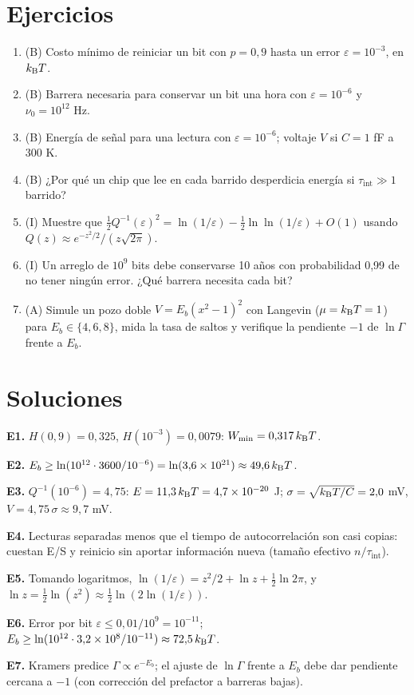 \documentclass[11pt,a4paper]{article}
\begin{document}
\section{Ejercicios}
\begin{enumerate}[label=\textbf{E\arabic*.}]
\item (B) Costo mínimo de reiniciar un bit con $p=0{,}9$ hasta un error $\varepsilon=10^{-3}$, en $k_{\mathrm B} T$.
\item (B) Barrera necesaria para conservar un bit una hora con $\varepsilon=10^{-6}$ y $\nu_0=10^{12}$ Hz.
\item (B) Energía de señal para una lectura con $\varepsilon=10^{-6}$; voltaje $V$ si $C=1$ fF a 300 K.
\item (B) ¿Por qué un chip que lee en cada barrido desperdicia energía si $\tau_{\text{int}}\gg1$ barrido?
\item (I) Muestre que $\tfrac12Q^{-1}(\varepsilon)^2=\ln(1/\varepsilon)-\tfrac12\ln\ln(1/\varepsilon)+O(1)$ usando $Q(z)\approx e^{-z^2/2}/(z\sqrt{2\pi})$.
\item (I) Un arreglo de $10^9$ bits debe conservarse 10 años con probabilidad 0,99 de no tener ningún error. ¿Qué barrera necesita cada bit?
\item (A) Simule un pozo doble $V=E_b(x^2-1)^2$ con Langevin ($\mu=k_{\mathrm B} T=1$) para $E_b\in\{4,6,8\}$, mida la tasa de saltos y verifique la
pendiente $-1$ de $\ln\Gamma$ frente a $E_b$.
\end{enumerate}
\section{Soluciones}
\begin{solucion}
\textbf{E1.} $H(0{,}9)=0{,}325$, $H(10^{-3})=0{,}0079$: $W_{\min}=0{,}317\,k_{\mathrm B} T$.

\textbf{E2.} $E_b\ge\ln(10^{12}\cdot3600/10^{-6})=\ln(3{,}6\times10^{21})\approx49{,}6\,k_{\mathrm B} T$.

\textbf{E3.} $Q^{-1}(10^{-6})=4{,}75$: $E=11{,}3\,k_{\mathrm B} T=4{,}7\times10^{-20}$ J; $\sigma=\sqrt{k_{\mathrm B} T/C}=2{,}0$ mV, $V=4{,}75\,\sigma\approx9{,}7$ mV.

\textbf{E4.} Lecturas separadas menos que el tiempo de autocorrelación son casi copias: cuestan E/S y reinicio sin aportar información nueva
(tamaño efectivo $n/\tau_{\text{int}}$).

\textbf{E5.} Tomando logaritmos, $\ln(1/\varepsilon)=z^2/2+\ln z+\tfrac12\ln2\pi$, y $\ln z=\tfrac12\ln(z^2)\approx\tfrac12\ln(2\ln(1/\varepsilon))$.

\textbf{E6.} Error por bit $\varepsilon\le0{,}01/10^9=10^{-11}$; $E_b\ge\ln(10^{12}\cdot3{,}2\times10^8/10^{-11})\approx72{,}5\,k_{\mathrm B} T$.

\textbf{E7.} Kramers predice $\Gamma\propto e^{-E_b}$; el ajuste de $\ln\Gamma$ frente a $E_b$ debe dar pendiente cercana a $-1$ (con corrección
del prefactor a barreras bajas).
\end{solucion}
\end{document}
